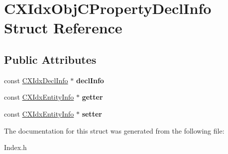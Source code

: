 \hypertarget{structCXIdxObjCPropertyDeclInfo}{}\section{C\+X\+Idx\+Obj\+C\+Property\+Decl\+Info Struct Reference}
\label{structCXIdxObjCPropertyDeclInfo}
\subsection*{Public Attributes}
\begin{DoxyCompactItemize}
\item 
\mbox{\label{structCXIdxObjCPropertyDeclInfo_a702a37ed4078ebabcb9e56822f4dcc10}} 
const \mbox{\hyperlink{structCXIdxDeclInfo}{C\+X\+Idx\+Decl\+Info}} $\ast$ {\bfseries decl\+Info}
\item 
\mbox{\label{structCXIdxObjCPropertyDeclInfo_a4e750cdf4e99925701977b690a75e836}} 
const \mbox{\hyperlink{structCXIdxEntityInfo}{C\+X\+Idx\+Entity\+Info}} $\ast$ {\bfseries getter}
\item 
\mbox{\label{structCXIdxObjCPropertyDeclInfo_a3ac3b902f120afae9b10691b4ca15fe5}} 
const \mbox{\hyperlink{structCXIdxEntityInfo}{C\+X\+Idx\+Entity\+Info}} $\ast$ {\bfseries setter}
\end{DoxyCompactItemize}


The documentation for this struct was generated from the following file\+:\begin{DoxyCompactItemize}
\item 
Index.\+h\end{DoxyCompactItemize}
